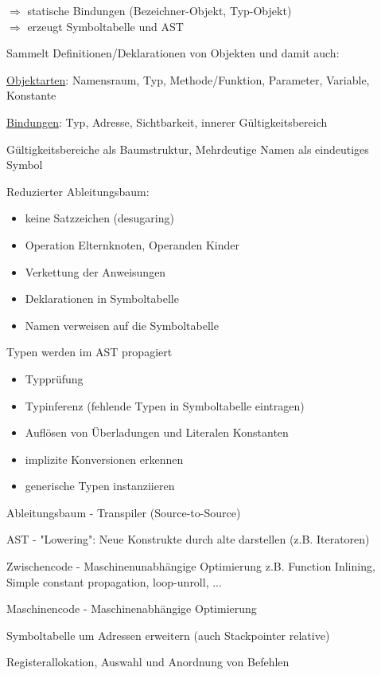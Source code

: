 $\Rightarrow$ statische Bindungen (Bezeichner-Objekt, Typ-Objekt)\\
$\Rightarrow$ erzeugt Symboltabelle und AST

 Sammelt Definitionen/Deklarationen von Objekten und damit auch:

\underline{Objektarten}: Namensraum, Typ, Methode/Funktion, Parameter, Variable, Konstante

\underline{Bindungen}: Typ, Adresse, Sichtbarkeit, innerer Gültigkeitsbereich

Gültigkeitsbereiche als Baumstruktur, Mehrdeutige Namen als eindeutiges Symbol


Reduzierter Ableitungsbaum: 
\begin{itemize}
	\item keine Satzzeichen (desugaring)
	\item Operation Elternknoten, Operanden Kinder
	\item Verkettung der Anweisungen
	\item Deklarationen in Symboltabelle
	\item Namen verweisen auf die Symboltabelle
\end{itemize}

Typen werden im AST propagiert 
\begin{itemize}
\item Typprüfung
\item Typinferenz (fehlende Typen in Symboltabelle eintragen)
\item Auflösen von Überladungen und Literalen Konstanten
\item implizite Konversionen erkennen
\item generische Typen instanziieren
\end{itemize}



Ableitungsbaum - Transpiler (Source-to-Source)

AST - "Lowering": Neue Konstrukte durch alte darstellen (z.B. Iteratoren)

Zwischencode - Maschinenunabhängige Optimierung z.B. Function Inlining, Simple constant propagation, loop-unroll, ...

Maschinencode - Maschinenabhängige Optimierung

Symboltabelle um Adressen erweitern (auch Stackpointer relative)

Registerallokation, Auswahl und Anordnung von Befehlen

